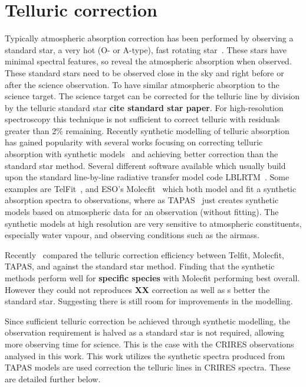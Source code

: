 
\section{Telluric correction}
\label{sec:telluric_correction}

Typically atmospheric absorption correction has been performed by observing a standard star, a very hot (O- or A-type), fast rotating star~\citep{vacca_method_2003}.
These stars have minimal spectral features, so reveal the atmospheric absorption when observed.
These standard stars need to be observed close in the sky and right before or after the science observation.
To have similar atmospheric absorption to the science target.
The science target can be corrected for the telluric line by division by the telluric standard star \textbf{cite standard star paper}. 
For high-resolution spectroscopy this technique is not sufficient to correct telluric with residuals greater than 2\% remaining. 
Recently synthetic modelling of telluric absorption has gained popularity with several works focusing on correcting telluric absorption with synthetic models~\citep[e.g.][]{baily_correcting_2007, cotton_atmospheric_2014, seifart_synthesising_2010} and achieving better correction than the standard star method. 
Several different software available which usually build upon  the standard line-by-line radiative transfer model code LBLRTM~\citep{clough_linebyline_1995}.
Some examples are TelFit~\citep{guilkson_correctiong_2014}, and ESO's Molecfit~\citep{smette_molecfit_2015} which both model and fit a synthetic absorption spectra to observations, where as TAPAS~\citep{bertaux_tapas_2014} just creates synthetic models based on atmospheric data for an observation (without fitting).
The synthetic models at high resolution are very sensitive to atmospheric constituents, especially water vapour, and observing conditions such as the airmass.

{\red{} Recently~\citet{ulmer-moll_telluric_2018} compared the telluric correction efficiency between Telfit,  Molecfit, TAPAS, and against the standard star method.
Finding that the synthetic methods perform well for \textbf{specific species} with Molecfit performing best overall.
However they could not reproduces\textbf{ XX} correction as well as s better the standard star.
Suggesting there is still room for improvements in the modelling.} 

Since sufficient telluric correction be achieved through synthetic modelling, the observation requirement is halved as a standard star is not required, allowing more observing time for science.
This is the case with the CRIRES observations analysed in this work.
This work utilizes the synthetic spectra produced from TAPAS models are used correction the telluric lines in CRIRES spectra.
These are detailed further below.


